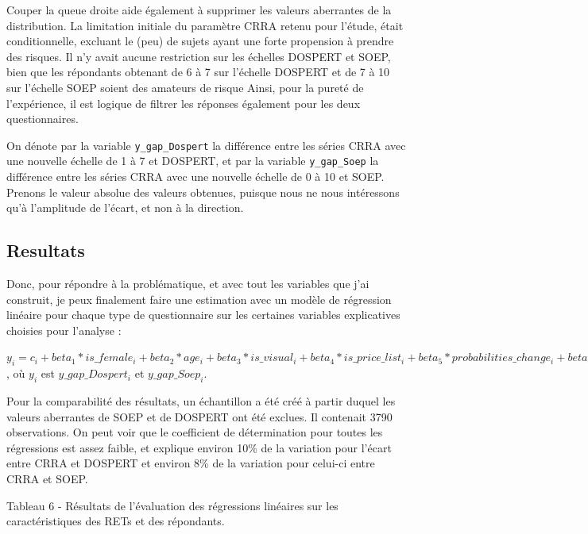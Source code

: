 \documentclass[12pt]{article}
\begin{document}
Couper la queue droite aide également à supprimer les valeurs aberrantes
de la distribution. La limitation initiale du paramètre CRRA retenu pour
l'étude, était conditionnelle, excluant le (peu) de sujets ayant une
forte propension à prendre des risques. Il n'y avait aucune restriction
sur les échelles DOSPERT et SOEP, bien que les répondants obtenant de 6
à 7 sur l'échelle DOSPERT et de 7 à 10 sur l'échelle SOEP soient des
amateurs de risque Ainsi, pour la pureté de l'expérience, il est logique
de filtrer les réponses également pour les deux questionnaires.

On dénote par la variable \texttt{y\_gap\_Dospert} la différence entre
les séries CRRA avec une nouvelle échelle de 1 à 7 et DOSPERT, et par la
variable \texttt{y\_gap\_Soep} la différence entre les séries CRRA avec
une nouvelle échelle de 0 à 10 et SOEP. Prenons le valeur absolue des
valeurs obtenues, puisque nous ne nous intéressons qu'à l'amplitude de
l'écart, et non à la direction.

\subsection{Resultats}

Donc, pour répondre à la problématique, et avec tout les variables que
j'ai construit, je peux finalement faire une estimation avec un modèle
de régression linéaire pour chaque type de questionnaire sur les
certaines variables explicatives choisies pour l'analyse :

\(y_i = c_i + beta_1 * is\_female_i+ beta_2 * age_i + beta_3 * is\_visual_i + beta_4 * is\_price\_list_i + beta_5 * probabilities\_change_i + beta_6 * stakes_i + beta_7 * germany_i + epsilon_i\)
, où \(y_i\) est \(y\_gap\_Dospert_i\) et \(y\_gap\_Soep_i\).

Pour la comparabilité des résultats, un échantillon a été créé à partir
duquel les valeurs aberrantes de SOEP et de DOSPERT ont été exclues. Il
contenait 3790 observations. On peut voir que le coefficient de
détermination pour toutes les régressions est assez faible, et explique
environ 10\% de la variation pour l'écart entre CRRA et DOSPERT et
environ 8\% de la variation pour celui-ci entre CRRA et SOEP.

Tableau 6 - Résultats de l'évaluation des régressions linéaires sur les
caractéristiques des RETs et des répondants.
\end{document}
